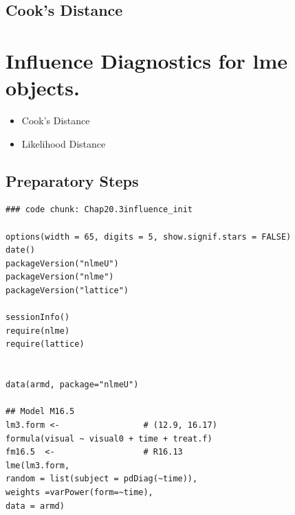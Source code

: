 \documentclass[a4paper,12pt]{article}
\begin{document}
\subsection{Cook's Distance}



\section{Influence Diagnostics for lme objects.}

\begin{itemize}
\item Cook's Distance
\item Likelihood Distance
\end{itemize}

\subsection{Preparatory Steps}

\begin{framed}
\begin{verbatim}
### code chunk: Chap20.3influence_init

options(width = 65, digits = 5, show.signif.stars = FALSE)
date()
packageVersion("nlmeU")
packageVersion("nlme")
packageVersion("lattice")

sessionInfo()
require(nlme)    
require(lattice) 


data(armd, package="nlmeU")

## Model M16.5 
lm3.form <-                 # (12.9, 16.17)
formula(visual ~ visual0 + time + treat.f) 
fm16.5  <-                  # R16.13
lme(lm3.form,              
random = list(subject = pdDiag(~time)),       
weights =varPower(form=~time),
data = armd)       
\end{verbatim}
\end{framed}
\end{document}
